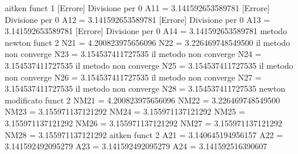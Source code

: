aitken funct 1
[Errore] Divisione per 0
A11 =
   3.141592653589781
[Errore] Divisione per 0
A12 =
   3.141592653589781
[Errore] Divisione per 0
A13 =
   3.141592653589781
[Errore] Divisione per 0
A14 =
   3.141592653589781
metodo newton funct 2
N21 =
   4.200823975656096
N22 =
   3.226469748549500
il metodo non converge
N23 =
   3.154537411727535
il metodo non converge
N24 =
   3.154537411727535
il metodo non converge
N25 =
   3.154537411727535
il metodo non converge
N26 =
   3.154537411727535
il metodo non converge
N27 =
   3.154537411727535
il metodo non converge
N28 =
   3.154537411727535
newton modificato funct 2
NM21 =
   4.200823975656096
NM22 =
   3.226469748549500
NM23 =
   3.155971137121292
NM24 =
   3.155971137121292
NM25 =
   3.155971137121292
NM26 =
   3.155971137121292
NM27 =
   3.155971137121292
NM28 =
   3.155971137121292
aitken funct 2
A21 =
   3.140645194956157
A22 =
   3.141592492095279
A23 =
   3.141592492095279
A24 =
   3.141592516390607
